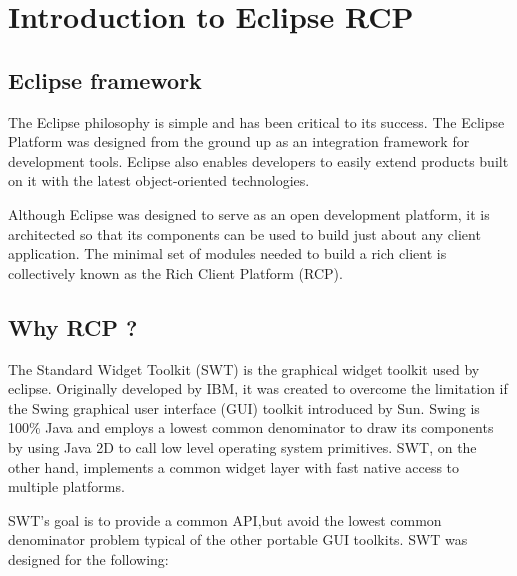 
\section{Introduction to Eclipse RCP}
\subsection{Eclipse framework}

The Eclipse philosophy is simple and has been critical to its success. The
Eclipse Platform was designed from the ground up as an integration framework for
development tools. Eclipse also enables developers to easily extend products
built on it with the latest object-oriented technologies.

Although Eclipse was designed to serve as an open development platform, it is
architected so that its components can be used to build just about any client
application. The minimal set of modules needed to build a rich client is
collectively known as the Rich Client Platform (RCP).

\subsection{Why RCP ?}
The Standard Widget Toolkit (SWT) is the graphical widget toolkit used by
eclipse. Originally developed by IBM, it was created to overcome the limitation
if the Swing graphical user interface (GUI) toolkit introduced by Sun. Swing is
100\% Java and employs a lowest common denominator to draw its components by
using Java 2D to call low level operating system primitives. SWT, on the other
hand, implements a common widget layer with fast native access to multiple
platforms.

SWT's goal is to provide a common API,but avoid the lowest common denominator
problem typical of the other portable GUI toolkits. SWT was designed for the
following:

